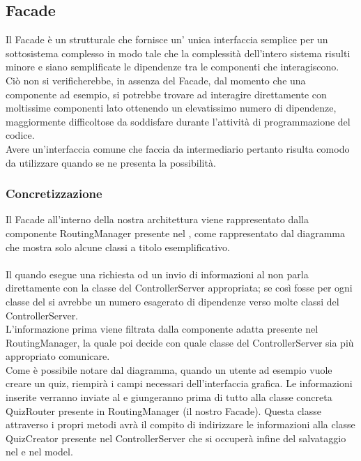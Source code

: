 \documentclass[a4paper, titlepage]{article}
\begin{document}
\subsection{Facade}
Il Facade è un  strutturale che fornisce un’ unica interfaccia semplice per un sottosistema complesso in modo tale che la complessità dell'intero sistema risulti minore e siano semplificate le dipendenze tra le componenti che interagiscono.
\\ Ciò non si verificherebbe, in assenza del Facade, dal momento che una componente  ad esempio, si potrebbe trovare ad interagire direttamente con moltissime componenti lato  ottenendo un elevatissimo numero di dipendenze, maggiormente difficoltose da soddisfare durante l'attività di programmazione del codice.
\\ Avere un'interfaccia comune che faccia da intermediario pertanto risulta comodo da utilizzare quando se ne presenta la possibilità.

\subsubsection{Concretizzazione}
Il Facade all'interno della nostra architettura viene rappresentato dalla componente RoutingManager presente nel , come rappresentato dal diagramma che mostra solo alcune classi a titolo esemplificativo.
\\
\\ Il  quando esegue una richiesta od un invio di informazioni al  non parla direttamente con la classe del ControllerServer appropriata; se così fosse per ogni classe del  si avrebbe un numero esagerato di dipendenze verso molte classi del ControllerServer.
\\L'informazione prima viene filtrata dalla componente adatta presente nel  RoutingManager, la quale poi decide con quale classe del ControllerServer sia più appropriato comunicare.
\\ Come è possibile notare dal diagramma, quando un utente ad esempio vuole creare un quiz, riempirà i campi necessari dell'interfaccia grafica. Le informazioni inserite verranno inviate al  e giungeranno prima di tutto alla classe concreta QuizRouter presente in RoutingManager (il nostro Facade). Questa classe attraverso i propri metodi avrà il compito di indirizzare le informazioni alla classe QuizCreator presente nel ControllerServer che si occuperà infine del salvataggio nel  e nel model.
\end{document}
